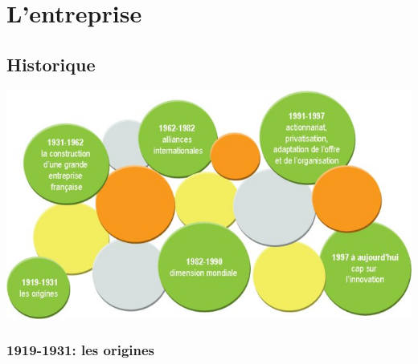 \documentclass{article}
\begin{document}
	\section{L'entreprise}
		\subsection{Historique}
		\begin{center}
		\includegraphics[scale=0.5]{histoire_fr.jpg}
		\end{center}
		\subsubsection{1919-1931: les origines}
\end{document}
